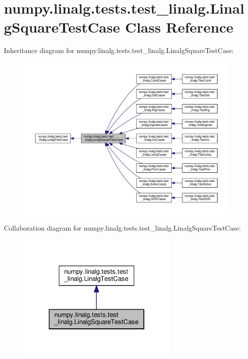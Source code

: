 \hypertarget{classnumpy_1_1linalg_1_1tests_1_1test__linalg_1_1LinalgSquareTestCase}{}\section{numpy.\+linalg.\+tests.\+test\+\_\+linalg.\+Linalg\+Square\+Test\+Case Class Reference}
\label{classnumpy_1_1linalg_1_1tests_1_1test__linalg_1_1LinalgSquareTestCase}


Inheritance diagram for numpy.\+linalg.\+tests.\+test\+\_\+linalg.\+Linalg\+Square\+Test\+Case\+:
\nopagebreak
\begin{figure}[H]
\begin{center}
\leavevmode
\includegraphics[width=350pt]{classnumpy_1_1linalg_1_1tests_1_1test__linalg_1_1LinalgSquareTestCase__inherit__graph}
\end{center}
\end{figure}


Collaboration diagram for numpy.\+linalg.\+tests.\+test\+\_\+linalg.\+Linalg\+Square\+Test\+Case\+:
\nopagebreak
\begin{figure}[H]
\begin{center}
\leavevmode
\includegraphics[width=226pt]{classnumpy_1_1linalg_1_1tests_1_1test__linalg_1_1LinalgSquareTestCase__coll__graph}
\end{center}
\end{figure}
